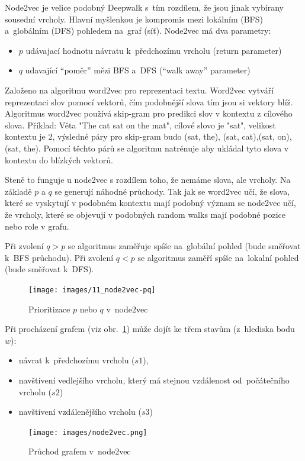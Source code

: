 Node2vec je velice podobný Deepwalk s~tím rozdílem, že jsou jinak vybírany sousední vrcholy.
Hlavní myšlenkou je kompromis mezi lokálním (BFS) a~globálním (DFS) pohledem na~graf (síť).
Node2vec má dva parametry:
\begin{itemize}
    \item $p$ udávajací hodnotu návratu k~předchozímu vrcholu (return parameter)
    \item $q$ udavající \enquote{poměr} mězi BFS a~DFS (\enquote{walk away} parameter)
\end{itemize}

Založeno na algoritmu word2vec pro reprezentaci textu. Word2vec vytváří reprezentaci slov pomocí vektorů, čím podobnější slova tím jsou si 
vektory blíž. Algoritmus word2vec používá skip-gram pro predikci slov v kontextu
z cílového slova. Příklad: Věta "The cat sat on the mat", cílové slovo je "sat", velikost kontextu je 2, výsledné páry pro skip-gram budo (sat, the), (sat, cat),(sat, on),(sat, the).
Pomocí těchto párů se algoritmu natrénuje aby ukládal tyto slova v kontextu do blízkých vektorů.

Steně to funguje u node2vec s rozdílem toho, že nemáme slova, ale vrcholy. Na základě \(p\) a \(q\) se generují náhodné průchody. 
Tak jak se word2vec učí, že slova, které se vyskytují v podobném kontextu mají podobný význam se node2vec učí, že vrcholy, které se objevují
v podobných random walks mají podobné pozice nebo role v grafu.

Při zvolení $q>p$ se algoritmus zaměřuje spíše na~globální pohled (bude směřovat k~BFS průchodu). Při zvolení $q<p$ se algoritmus zaměří spíše na~lokalní pohled (bude směřovat k~DFS).

\begin{figure}[ht]
    \centering
    \texttt{[image: images/11\_node2vec-pq]}
    \caption{Prioritizace $p$ nebo $q$ v~node2vec}
\end{figure}

Při procházení grafem (viz obr.~\ref{pruchod-node2vec}) může dojít ke třem stavům (z~hlediska bodu $w$):
\begin{itemize}
    \item návrat k~předchozímu vrcholu ($s1$),
    \item navštívení vedlejšího vrcholu, který má stejnou vzdálenost od~počátečního vrcholu ($s2$)
    \item navštívení vzdálenějšího vrcholu ($s3$)
\end{itemize}

\begin{figure}
    \centering
    \texttt{[image: images/node2vec.png]}
    \caption{Průchod grafem v~node2vec}
    \label{pruchod-node2vec}
\end{figure}


